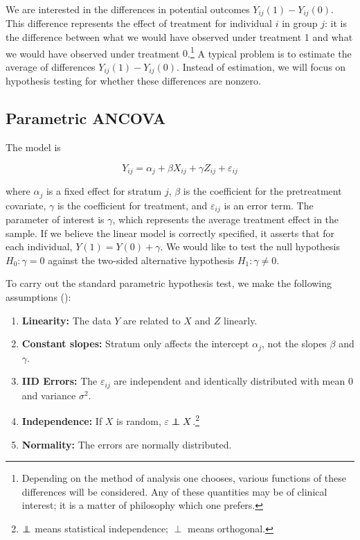 \documentclass[11pt]{article}
\newcommand{\eps}{\varepsilon}
\newcommand\independent{\protect\mathpalette{\protect\independenT}{\perp}}
\def\independenT#1#2{\mathrel{\rlap{$#1#2$}\mkern2mu{#1#2}}}
\begin{document}
We are interested in the differences in potential outcomes $Y_{ij}(1) - Y_{ij}(0)$.
This difference represents the effect of treatment for individual $i$ in group $j$: it is the difference between what we would have observed under treatment 1 and what we would have observed under treatment $0$.\footnote{
Depending on the method of analysis one chooses, various functions of these differences will be considered.
Any of these quantities may be of clinical interest; it is a matter of philosophy which one prefers.}
A typical problem is to estimate the average of differences $Y_{ij}(1) - Y_{ij}(0)$.
Instead of estimation, we will focus on hypothesis testing for whether these differences are nonzero.

\subsection{Parametric ANCOVA}

The model is

$$Y_{ij} = \alpha_j + \beta X_{ij} + \gamma Z_{ij} + \eps_{ij}$$

\noindent where $\alpha_j$ is a fixed effect for stratum $j$, $\beta$ is the coefficient for the pretreatment covariate,
$\gamma$ is the coefficient for treatment,
and $\eps_{ij}$ is an error term.
The parameter of interest is $\gamma$, which represents the average treatment effect in the sample. 
If we believe the linear model is correctly specified, it asserts that for each individual, $Y(1) = Y(0) + \gamma$.
We would like to test the null hypothesis $H_0: \gamma = 0$ against
the two-sided alternative hypothesis $H_1: \gamma \neq 0$.

To carry out the standard parametric hypothesis test, we make the following assumptions (\cite{freedman_statistical_2005}):

\begin{enumerate}
\item \textbf{Linearity:} The data $Y$ are related to $X$ and $Z$ linearly.
\item \textbf{Constant slopes:} Stratum only affects the intercept $\alpha_j$, not the slopes $\beta$ and $\gamma$.
\item \textbf{IID Errors:} The $\eps_{ij}$ are independent and identically distributed with mean $0$ and variance $\sigma^2$.
\item \textbf{Independence:} If $X$ is random, $\eps \independent X$.\footnote{$\independent$ means statistical independence; $\perp$ means orthogonal.}
\item \textbf{Normality:} The errors are normally distributed.
\end{enumerate}
\end{document}
